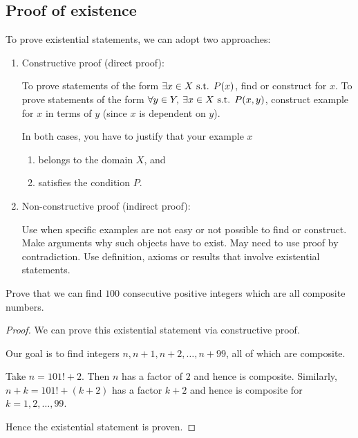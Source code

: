 \subsection{Proof of existence}
To prove existential statements, we can adopt two approaches:
\begin{enumerate}
\item Constructive proof (direct proof): 

To prove statements of the form $\exists x\in X \text{ s.t. } P(x)$, find or construct  for $x$. To prove statements of the form $\forall y\in Y,\:\exists x\in X\text{ s.t. } P(x,y)$, construct example for $x$ in terms of $y$ (since $x$ is dependent on $y$).

In both cases, you have to justify that your example $x$
\begin{enumerate}
\item belongs to the domain $X$, and
\item satisfies the condition $P$.
\end{enumerate}

\item Non-constructive proof (indirect proof): 

Use when specific examples are not easy or not possible to find or construct.
Make arguments why such objects have to exist.
May need to use proof by contradiction.
Use definition, axioms or results that involve existential statements.
\end{enumerate}

\begin{exercise}
Prove that we can find $100$ consecutive positive integers which are all composite numbers.
\end{exercise}

\begin{proof}
We can prove this existential statement via constructive proof.

Our goal is to find integers $n,n+1,n+2,\dots,n+99$, all of which are composite.

Take $n=101!+2$. Then $n$ has a factor of $2$ and hence is composite. Similarly, $n+k=101!+(k+2)$ has a factor $k+2$ and hence is composite for $k=1,2,\dots,99$.

Hence the existential statement is proven.
\end{proof}

